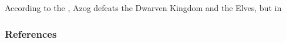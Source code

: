 \documentclass{beamer}
\begin{document}
	\begin{frame}
	According to the \cite{KL2003}, Azog defeats the Dwarven Kingdom and the Elves, but in \cite{MJ2015}\nocite{JJ2006}
	\end{frame}
	\begin{frame}[allowframebreaks]
		\frametitle{References}
		\nocite{*}
		\printbibliography
	\end{frame}
\end{document}
